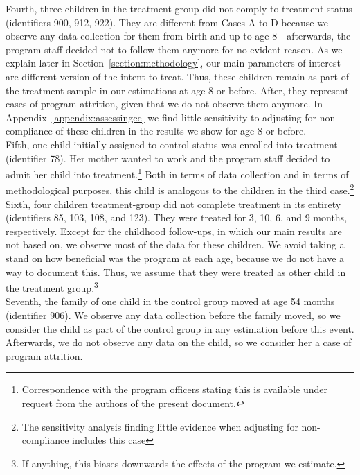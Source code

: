 \noindent Fourth, three children in the treatment group did not comply to treatment status (identifiers 900, 912, 922). They are different from Cases A to D because we observe any data collection for them from birth and up to age 8---afterwards, the program staff decided not to follow them anymore for no evident reason. As we explain later in Section~\ref{section:methodology}, our main parameters  of interest are different version of the intent-to-treat. Thus, these children remain as part of the treatment sample in our estimations at age 8 or before. After, they represent cases of program attrition, given that we do not observe them anymore. In Appendix~\ref{appendix:assessingcc} we find little sensitivity to adjusting for non-compliance of these children in the results we show for age 8 or before.\\



\noindent Fifth, one child initially assigned to control status was enrolled into treatment (identifier 78). Her mother wanted to work and the program staff decided to admit her child into treatment.\footnote{Correspondence with the program officers stating this is available under request from the authors of the present document.} Both in terms of data collection and in terms of methodological purposes, this child is analogous to the children in the third case.\footnote{The sensitivity analysis finding little evidence when adjusting for non-compliance includes this case}\\

\noindent Sixth, four children treatment-group did not complete treatment in its entirety (identifiers 85, 103, 108, and 123). They were treated for 3, 10, 6, and 9 months, respectively. Except for the childhood follow-ups, in which our main results are not based on, we observe most of the data for these children. We avoid taking a stand on how beneficial was the program at each age, because we do not have a way to document this. Thus, we assume that they were treated as other child in the treatment group.\footnote{If anything, this biases downwards the effects of the program we estimate.} \\

\noindent Seventh, the family of one child in the control group moved at age 54 months (identifier 906). We observe any data collection before the family moved, so we consider the child as part of the control group in any estimation before this event. Afterwards, we do not observe any data on the child, so we consider her a case of program attrition.\\

